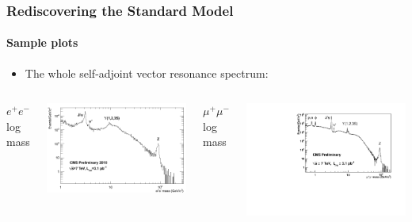 \documentclass[compress]{beamer}
\begin{document}
\begin{frame}
\frametitle{Rediscovering the Standard Model}
\framesubtitle{Sample plots}

\vspace{-0.5 cm}
\begin{itemize}
\item The whole self-adjoint vector resonance spectrum:
\end{itemize}

\vspace{-0.6 cm}
\begin{columns}
\begin{center} $e^+e^-$ log mass \end{center}

\vspace{-0.3 cm}
\includegraphics[width=\linewidth]{spectrum_ee.png}

\begin{center} $\mu^+\mu^-$ log mass \end{center}

\vspace{-0.3 cm}
\includegraphics[width=\linewidth]{spectrum_mumu.pdf}
\end{columns}


\end{frame}
\end{document}
